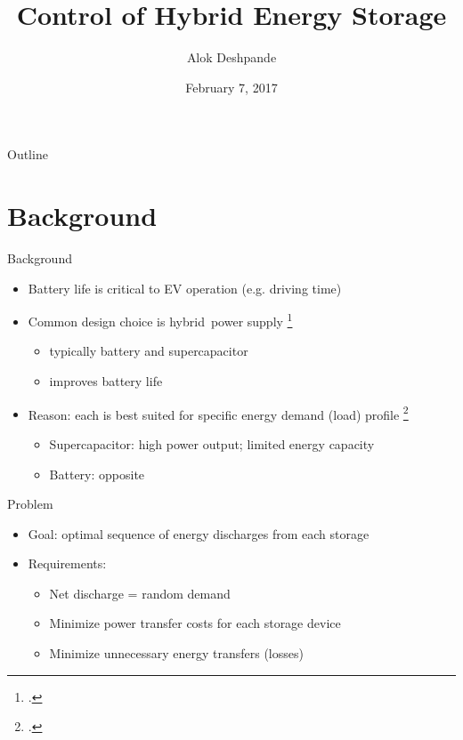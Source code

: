 \documentclass{beamer}
\title{Control of Hybrid Energy Storage}
\author{Alok Deshpande}
\date{February 7, 2017}
\begin{document}
	
	\begin{frame}
	\titlepage
	\end{frame}

\begin{frame}{Outline}
\tableofcontents
\end{frame}

\section{Background}
\begin{frame}{Background}
	\begin{itemize}
		\item Battery life is critical to EV operation (e.g. driving time) 
		\item Common design choice is hybrid power supply \footcite{thounthong2009energy}
		\begin{itemize}
			\item typically battery and supercapacitor
			\item improves battery life
		\end{itemize}
		\item Reason: each is best suited for specific energy demand (load) profile \footcite{thounthong2009energy}
		\begin{itemize}
			\item Supercapacitor: high power output; limited energy capacity
			\item Battery: opposite
		\end{itemize}
	\end{itemize}
\end{frame}
\begin{frame}{Problem}
	\begin{itemize}
		\item Goal: optimal sequence of energy discharges from each storage
		\item Requirements:
		\begin{itemize}
			\item Net discharge = random demand
			\item Minimize power transfer costs for each storage device
			\item Minimize unnecessary energy transfers (losses)
		\end{itemize}
	\end{itemize}
\end{frame}
\end{document}
